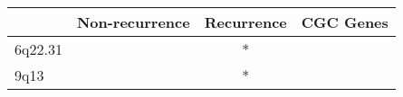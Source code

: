 \begin{tabular}{lccr}
\toprule
{} & Non-recurrence & Recurrence & CGC Genes \\
\midrule
6q22.31 &                &          * &           \\
9q13    &                &          * &           \\
\bottomrule
\end{tabular}
